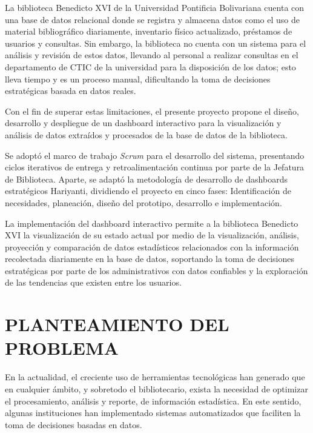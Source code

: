 \documentclass[spanish]{ieee_upb}
\begin{document}
La biblioteca Benedicto XVI de la Universidad Pontificia Bolivariana cuenta con una base de datos relacional donde se registra y almacena datos como el uso de material bibliográfico diariamente, inventario físico actualizado, préstamos de usuarios y consultas. Sin embargo, la biblioteca no cuenta con un sistema para el análisis y revisión de estos datos, llevando al personal a realizar consultas en el departamento de CTIC de la universidad para la disposición de los datos; esto lleva tiempo y es un proceso manual, dificultando la toma de decisiones estratégicas basada en datos reales. 

\vspace{0.3cm}
Con el fin de superar estas limitaciones, el presente proyecto propone el diseño, desarrollo y despliegue de un dashboard interactivo para la visualización y análisis de datos extraídos y procesados de la base de datos de la biblioteca.

\vspace{0.3cm}
Se adoptó el marco de trabajo \textit{Scrum} para el desarrollo del sistema, presentando ciclos iterativos de entrega y retroalimentación continua por parte de la Jefatura de Biblioteca. Aparte, se adaptó la metodología de desarrollo de dashboards estratégicos Hariyanti, dividiendo el proyecto en cinco fases: Identificación de necesidades, planeación, diseño del prototipo, desarrollo e implementación. 

\vspace{0.3cm}
La implementación del dashboard interactivo permite a la biblioteca Benedicto XVI la visualización de su estado actual  por medio de la visualización, análisis, proyección y comparación de datos estadísticos relacionados con la información recolectada diariamente en la base de datos, soportando la toma de decisiones estratégicas por parte de los administrativos con datos confiables y la exploración de las tendencias que existen entre los usuarios. 


\newpage
\section{PLANTEAMIENTO DEL PROBLEMA}

En la actualidad, el creciente uso de herramientas tecnológicas han generado que en cualquier ámbito, y sobretodo el bibliotecario, exista la necesidad de optimizar el procesamiento, análisis y reporte, de información estadística. En este sentido, algunas instituciones han implementado sistemas automatizados que faciliten la toma de decisiones basadas en datos. 
\end{document}
